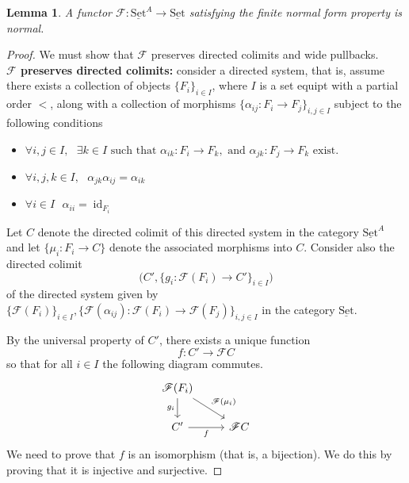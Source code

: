 \documentclass[12pt]{article}
\theoremstyle{plain}
\newtheorem{lemma}[thm]{Lemma}
\theoremstyle{definition}
\newcommand{\scr}[1]{\mathscr{#1}}
\newcommand{\lto}{\longrightarrow}
\newcommand{\set}{\operatorname{\underline{Set}}}
\begin{document}
	\begin{lemma}\label{lem:normal_from_prop--->normal}
		A functor $\scr{F}: \set^A \lto \set$ satisfying the finite normal form property is normal.
		\end{lemma}
	\begin{proof}
		We must show that $\scr{F}$ preserves directed colimits and wide pullbacks.\\
		\textbf{$\scr{F}$ preserves directed colimits:} consider a directed system, that is, assume there exists a collection of objects $\lbrace F_i \rbrace_{i \in I}$, where $I$ is a set equipt with a partial order $<$, along with a collection of morphisms $\lbrace \alpha_{ij}: F_i \lto F_j \rbrace_{i,j \in I}$ subject to the following conditions
		\begin{itemize}
			\item $\forall i, j \in I,\text{ }\exists k \in I\text{ such that }\alpha_{ik}: F_i \lto F_k, \text{ and } \alpha_{jk}: F_j \lto F_k\text{ exist.}$
			\item $\forall i,j,k \in I,\text{ }\alpha_{jk} \alpha_{ij} = \alpha_{ik}$
			\item $\forall i \in I\text{ }\alpha_{ii} = \operatorname{id}_{F_i}$
			\end{itemize}
		Let $C$ denote the directed colimit of this directed system in the category $\set^A$ and let $\{\mu_i: F_i \lto C\}$ denote the associated morphisms into $C$. Consider also the directed colimit
		\begin{equation}
			\big(C',\{g_i: \scr{F}(F_i) \lto C'\}_{i \in I}\big)
		\end{equation}
		of the directed system given by $\lbrace \scr{F}( F_i) \rbrace_{i \in I}, \lbrace \scr{F}(\alpha_{ij}): \scr{F}(F_i) \lto \scr{F}(F_j)\rbrace_{i,j \in I}$ in the category $\set$.
		
		By the universal property of $C'$, there exists a unique function
		\begin{equation}
			f: C' \lto \scr{F}C
			\end{equation}
		so that for all $i \in I$ the following diagram commutes.
		\begin{equation}
			\begin{tikzcd}
				\scr{F}(F_i)\arrow[d,swap,"{g_i}"]\arrow[dr,"{\scr{F}(\mu_i)}"]\\
				C'\arrow[r,swap,"{f}"] & \scr{F} C
				\end{tikzcd}
			\end{equation}
		We need to prove that $f$ is an isomorphism (that is, a bijection). We do this by proving that it is injective and surjective.
		

\end{proof}
\end{document}
